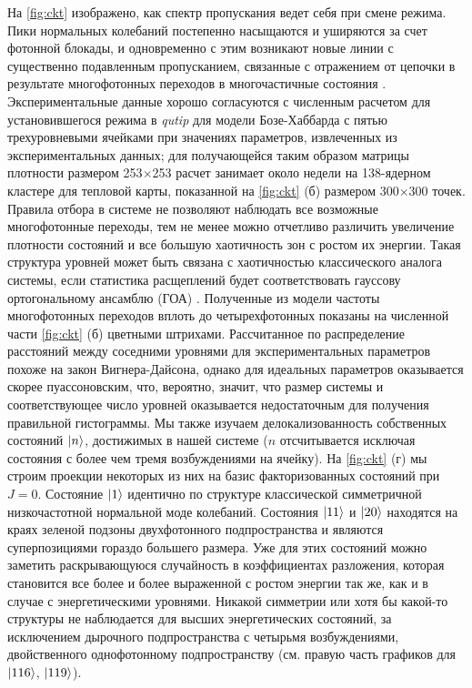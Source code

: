 \documentclass[14pt, a4paper]{extreport}
\DeclarePairedDelimiter\ket{\lvert}{\rangle}
\numberwithin{equation}{section}
\begin{document}
На \autoref{fig:ckt} изображено, как спектр пропускания ведет себя при смене режима. Пики нормальных колебаний постепенно насыщаются и уширяются за счет фотонной блокады, и одновременно с этим возникают новые линии с существенно подавленным пропусканием, связанные с отражением от цепочки в результате многофотонных переходов в многочастичные состояния \cite{Biella2015, PhysRevA.102.013707, roberts2020driven}. Экспериментальные данные хорошо согласуются с численным расчетом для установившегося режима в \textit{qutip} \cite{johansson2013qutip} для модели Бозе-Хаббарда с пятью трехуровневыми ячейками при значениях параметров, извлеченных из экспериментальных данных; для получающейся таким образом матрицы плотности размером 253$\times$253 расчет занимает около недели на 138-ядерном кластере для тепловой карты, показанной на \autoref{fig:ckt} (б) размером 300$\times$300 точек. Правила отбора в системе не позволяют наблюдать все возможные многофотонные переходы, тем не менее можно отчетливо различить увеличение плотности состояний и все большую хаотичность зон с ростом их энергии. Такая структура уровней может быть связана с хаотичностью классического аналога системы, если статистика расщеплений будет соответствовать гауссову ортогональному ансамблю (ГОА) \cite{bohigas1984characterization,zimmermann1986manifestation,kolovsky2004quantum, livan2018introduction}. Полученные из модели частоты многофотонных переходов вплоть до четырехфотонных показаны на численной части \autoref{fig:ckt} (б) цветными штрихами. Рассчитанное по распределение расстояний между соседними уровнями для экспериментальных параметров похоже на закон Вигнера-Дайсона, однако для идеальных параметров оказывается скорее пуассоновским, что, вероятно, значит, что размер системы и соответствующее число уровней оказывается недостаточным для получения правильной гистограммы. Мы также изучаем делокализованность собственных состояний $\ket{n}$, достижимых в нашей системе ($n$ отсчитывается исключая состояния с более чем тремя возбуждениями на ячейку). На \autoref{fig:ckt} (г) мы строим проекции некоторых из них на базис факторизованных состояний при $J=0$. Состояние $\ket{1}$ идентично по структуре классической симметричной низкочастотной нормальной моде колебаний. Состояния $\ket{11}$ и $\ket{20}$ находятся на краях зеленой подзоны двухфотонного подпространства и являются суперпозициями гораздо большего размера. Уже для этих состояний можно заметить раскрывающуюся случайность в коэффициентах разложения, которая становится все более и более выраженной с ростом энергии так же, как и в случае с энергетическими уровнями. Никакой симметрии или хотя бы какой-то структуры не наблюдается для высших энергетических состояний, за исключением дырочного подпространства с четырьмя возбуждениями, двойственного однофотонному подпространству (см. правую часть графиков для $\ket{116}$, $\ket{119}$).
\end{document}
